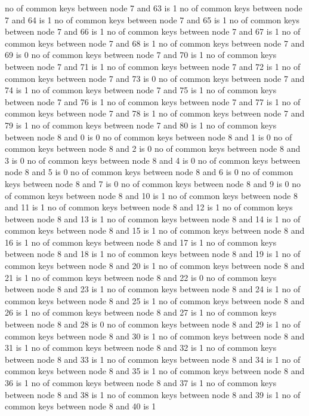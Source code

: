 no of common keys between node 7 and 63 is 1
no of common keys between node 7 and 64 is 1
no of common keys between node 7 and 65 is 1
no of common keys between node 7 and 66 is 1
no of common keys between node 7 and 67 is 1
no of common keys between node 7 and 68 is 1
no of common keys between node 7 and 69 is 0
no of common keys between node 7 and 70 is 1
no of common keys between node 7 and 71 is 1
no of common keys between node 7 and 72 is 1
no of common keys between node 7 and 73 is 0
no of common keys between node 7 and 74 is 1
no of common keys between node 7 and 75 is 1
no of common keys between node 7 and 76 is 1
no of common keys between node 7 and 77 is 1
no of common keys between node 7 and 78 is 1
no of common keys between node 7 and 79 is 1
no of common keys between node 7 and 80 is 1
no of common keys between node 8 and 0 is 0
no of common keys between node 8 and 1 is 0
no of common keys between node 8 and 2 is 0
no of common keys between node 8 and 3 is 0
no of common keys between node 8 and 4 is 0
no of common keys between node 8 and 5 is 0
no of common keys between node 8 and 6 is 0
no of common keys between node 8 and 7 is 0
no of common keys between node 8 and 9 is 0
no of common keys between node 8 and 10 is 1
no of common keys between node 8 and 11 is 1
no of common keys between node 8 and 12 is 1
no of common keys between node 8 and 13 is 1
no of common keys between node 8 and 14 is 1
no of common keys between node 8 and 15 is 1
no of common keys between node 8 and 16 is 1
no of common keys between node 8 and 17 is 1
no of common keys between node 8 and 18 is 1
no of common keys between node 8 and 19 is 1
no of common keys between node 8 and 20 is 1
no of common keys between node 8 and 21 is 1
no of common keys between node 8 and 22 is 0
no of common keys between node 8 and 23 is 1
no of common keys between node 8 and 24 is 1
no of common keys between node 8 and 25 is 1
no of common keys between node 8 and 26 is 1
no of common keys between node 8 and 27 is 1
no of common keys between node 8 and 28 is 0
no of common keys between node 8 and 29 is 1
no of common keys between node 8 and 30 is 1
no of common keys between node 8 and 31 is 1
no of common keys between node 8 and 32 is 1
no of common keys between node 8 and 33 is 1
no of common keys between node 8 and 34 is 1
no of common keys between node 8 and 35 is 1
no of common keys between node 8 and 36 is 1
no of common keys between node 8 and 37 is 1
no of common keys between node 8 and 38 is 1
no of common keys between node 8 and 39 is 1
no of common keys between node 8 and 40 is 1
